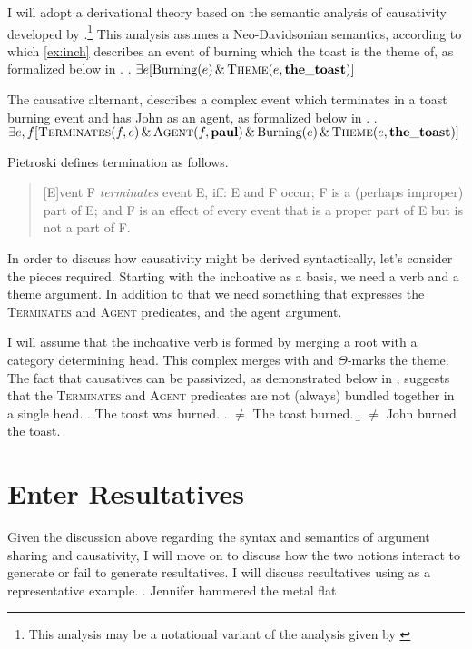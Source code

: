\documentclass[letterpaper,12pt]{article}
\begin{document}
I will adopt a derivational theory based on the semantic analysis of causativity developed by \textcite{pietroski2003small}.\footnote{
  This analysis may be a notational variant of the analysis given by \textcite{kratzer_building_2004}
}
This analysis assumes a Neo-Davidsonian semantics, according to which \ref{ex:inch} describes an event of burning which the toast is the theme of, as formalized below in \Next.
\ex. $\exists e [\text{Burning}(e)\, \&\, \textsc{Theme}(e, \mathbf{the\_toast})]$

The causative alternant, describes a complex event which terminates in a toast burning event and has John as an agent, as formalized below in \Next.
\ex. $\exists e,f [ \textsc{Terminates}(f, e) \,\&\, \textsc{Agent}(f, \mathbf{paul}) \,\&\, \text{Burning}(e)\, \&\, \textsc{Theme}(e, \mathbf{the\_toast})]$

Pietroski defines termination as follows.
\begin{quote}
  [E]vent F \textit{terminates} event E, iff: E and F occur; F is a (perhaps improper) part of E; and F is an effect of every event that is a proper part of E but is not a part of F.\hfill\parencite[p190]{pietroski2003small}
\end{quote}

In order to discuss how causativity might be derived syntactically, let's consider the pieces required.
Starting with the inchoative as a basis, we need a verb and a theme argument.
In addition to that we need something that expresses the \textsc{Terminates} and \textsc{Agent} predicates, and the agent argument.

I will assume that the inchoative verb is formed by merging a root with a category determining head.
This complex merges with and $\Theta$-marks the theme.
The fact that causatives can be passivized, as demonstrated below in \Next, suggests that the \textsc{Terminates} and \textsc{Agent} predicates are not (always) bundled together in a single head.
\ex. The toast was burned.
\a. $\neq$ The toast burned.
\b. $\neq$ John burned the toast.


\section{Enter Resultatives}
Given the discussion above regarding the syntax and semantics of argument sharing and causativity, I will move on to discuss how the two notions interact to generate or fail to generate resultatives.
I will discuss resultatives using \Next as a representative example.
\ex. Jennifer hammered the metal flat
\end{document}
